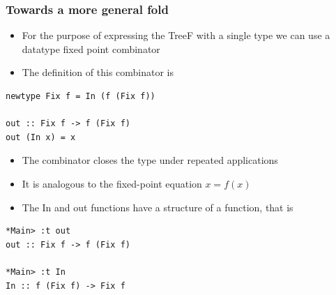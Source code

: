 \documentclass[10pt]{beamer}
\begin{document}
\begin{frame}[fragile]
\frametitle{Towards a more general fold}
\begin{itemize}
\item For the purpose of expressing the TreeF with a single type we can use a datatype fixed point combinator
\item The definition of this combinator is 
\end{itemize}

\begin{lstlisting}
newtype Fix f = In (f (Fix f))

out :: Fix f -> f (Fix f)
out (In x) = x
\end{lstlisting}


\begin{itemize}
\item The combinator closes the type under repeated applications
\item It is analogous to the fixed-point equation $x = f (x)$ 	
\item The In and out functions have a structure of a function, that is

\end{itemize}

\begin{lstlisting}
*Main> :t out 
out :: Fix f -> f (Fix f)

*Main> :t In
In :: f (Fix f) -> Fix f
\end{lstlisting}


\end{frame}
\end{document}
